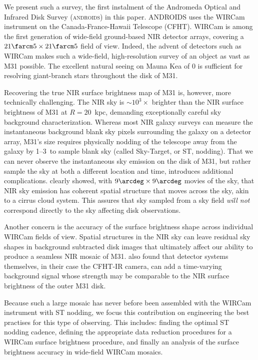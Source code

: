 \documentclass[iop]{emulateapj}
\newcommand{\androids}{\textsc{androids}}
\begin{document}
We present such a survey, the first instalment of the Andromeda Optical and Infrared Disk Survey (\androids) in this paper.
ANDROIDS uses the WIRCam instrument \citep{Puget:2004} on the Canada-France-Hawaii Telescope (CFHT).
WIRCam is among the first generation of wide-field ground-based NIR detector arrays, covering a $21\farcm 5 \times 21\farcm 5$ field of view.
Indeed, the advent of detectors such as WIRCam makes such a wide-field, high-resolution survey of an object as vast as M31 possible.
The excellent natural seeing on Mauna Kea of 0 is sufficient for resolving giant-branch stars throughout the disk of M31.

Recovering the true NIR surface brightness map of M31 is, however, more technically challenging.
The NIR sky is $\sim 10^3\times$ brighter than the NIR surface brightness of M31 at $R=20$~kpc, demanding exceptionally careful sky background characterization.
Whereas most NIR galaxy surveys can measure the instantaneous background blank sky pixels surrounding the galaxy on a detector array, M31's size requires physically nodding of the telescope away from the galaxy by 1\arcdeg--3\arcdeg\ to sample blank sky (called Sky-Target, or ST, nodding).
That we can never observe the instantaneous sky emission on the disk of M31, but rather sample the sky at both a different location and time, introduces additional complications.
\cite{Adams:1996} clearly showed, with $9\arcdeg \times 9\arcdeg$ movies of the sky, that NIR sky emission has coherent spatial structure that moves across the sky, akin to a cirrus cloud system.
This assures that sky sampled from a sky field \emph{will not} correspond directly to the sky affecting disk observations.

Another concern is the accuracy of the surface brightness shape across individual WIRCam fields of view.
Spatial structures in the NIR sky can leave residual sky shapes in background subtracted disk images that ultimately affect our ability to produce a seamless NIR mosaic of M31.
\cite{Vaduvescu:2004} also found that detector systems themselves, in their case the CFHT-IR camera, can add a time-varying background signal whose strength may be comparable to the NIR surface brightness of the outer M31 disk.

Because such a large mosaic has never before been assembled with the WIRCam instrument with ST nodding, we focus this contribution on engineering the best practises for this type of observing.
This includes: finding the optimal ST nodding cadence, defining the appropriate data reduction procedures for a WIRCam surface brightness procedure, and finally an analysis of the surface brightness accuracy in wide-field WIRCam mosaics.
\end{document}
